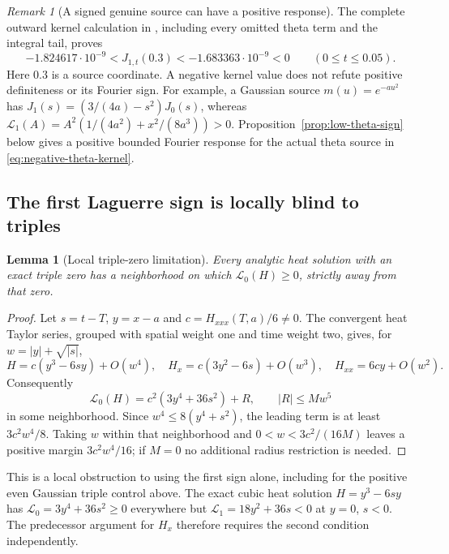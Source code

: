 \documentclass[11pt]{article}
\newtheorem{lemma}[theorem]{Lemma}
\theoremstyle{definition}
\theoremstyle{remark}
\newtheorem{remark}[theorem]{Remark}
\begin{document}
\begin{remark}[A signed genuine source can have a positive response]
The complete outward kernel calculation in \cite{thetacontinuation},
including every omitted theta term and the integral tail, proves
\begin{equation}
 -1.824617\cdot10^{-9}<J_{1,t}(0.3)
 <-1.683363\cdot10^{-9}<0\qquad(0\le t\le0.05).
 \label{eq:negative-theta-kernel}
\end{equation}
Here $0.3$ is a source coordinate. A negative kernel value does not
refute positive definiteness or its Fourier sign. For example, a
Gaussian source $m(u)=e^{-au^2}$ has
$J_1(s)=(3/(4a)-s^2)J_0(s)$, whereas
$\mathscr L_1(A)=A^2(1/(4a^2)+x^2/(8a^3))>0$.
Proposition~\ref{prop:low-theta-sign} below gives a positive bounded
Fourier response for the actual theta source in
\eqref{eq:negative-theta-kernel}.
\end{remark}

\subsection{The first Laguerre sign is locally blind to triples}

\begin{lemma}[Local triple-zero limitation]
\label{lem:triple-laguerre}
Every analytic heat solution with an exact triple zero has a neighborhood
on which $\mathscr L_0(H)\ge0$, strictly away from that zero.
\end{lemma}
\begin{proof}
Let $s=t-T$, $y=x-a$ and $c=H_{xxx}(T,a)/6\ne0$.
The convergent heat Taylor series, grouped with spatial weight one and
time weight two, gives, for $w=|y|+\sqrt{|s|}$,
\[
 H=c(y^3-6sy)+O(w^4),\quad H_x=c(3y^2-6s)+O(w^3),
 \quad H_{xx}=6cy+O(w^2).
\]
Consequently
\[
 \mathscr L_0(H)=c^2(3y^4+36s^2)+R,\qquad |R|\le Mw^5
\]
in some neighborhood. Since $w^4\le8(y^4+s^2)$, the leading term
is at least $3c^2w^4/8$. Taking $w$ within that neighborhood and
$0<w<3c^2/(16M)$ leaves a positive margin $3c^2w^4/16$;
if $M=0$ no additional radius restriction is needed.
\end{proof}

This is a local obstruction to using the first sign alone, including
for the positive even Gaussian triple control above. The exact cubic
heat solution $H=y^3-6sy$ has
$\mathscr L_0=3y^4+36s^2\ge0$ everywhere but
$\mathscr L_1=18y^2+36s<0$ at $y=0$, $s<0$. The predecessor argument
for $H_x$ therefore requires the second condition independently.
\end{document}
